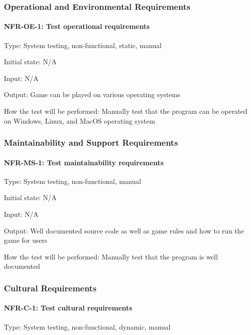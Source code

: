 \documentclass[12pt, titlepage]{article}
\begin{document}
\subsubsection{Operational and Environmental Requirements}

\paragraph{NFR-OE-1: Test operational requirements\\}

Type: System testing, non-functional, static, manual

Initial state: N/A

Input: N/A

Output: Game can be played on various operating systems

How the test will be performed: Manually test that the program can be operated on Windows, Linux, and MacOS operating system

\subsubsection{Maintainability and Support Requirements}

\paragraph{NFR-MS-1: Test maintainability requirements\\}

Type: System testing, non-functional, manual

Initial state: N/A

Input: N/A

Output: Well documented source code as well as game rules and how to run the game for users

How the test will be performed: Manually test that the program is well documented

\subsubsection{Cultural Requirements}

\paragraph{NFR-C-1: Test cultural requirements\\}

Type: System testing, non-functional, dynamic, manual
\end{document}
